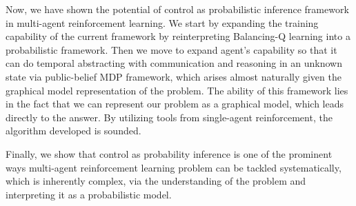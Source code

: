 \label{sec:chap6-summary}
Now, we have shown the potential of control as probabilistic inference framework in multi-agent reinforcement learning. We start by expanding the training capability of the current framework by reinterpreting Balancing-Q learning into a probabilistic framework. Then we move to expand agent's capability so that it can do temporal abstracting with communication and reasoning in an unknown state via public-belief MDP framework, which arises almost naturally given the graphical model representation of the problem. The ability of this framework lies in the fact that we can represent our problem as a graphical model, which leads directly to the answer. By utilizing tools from single-agent reinforcement, the algorithm developed is sounded. 

Finally, we show that control as probability inference is one of the prominent ways multi-agent reinforcement learning problem can be tackled systematically, which is inherently complex, via the understanding of the problem and interpreting it as a probabilistic model.